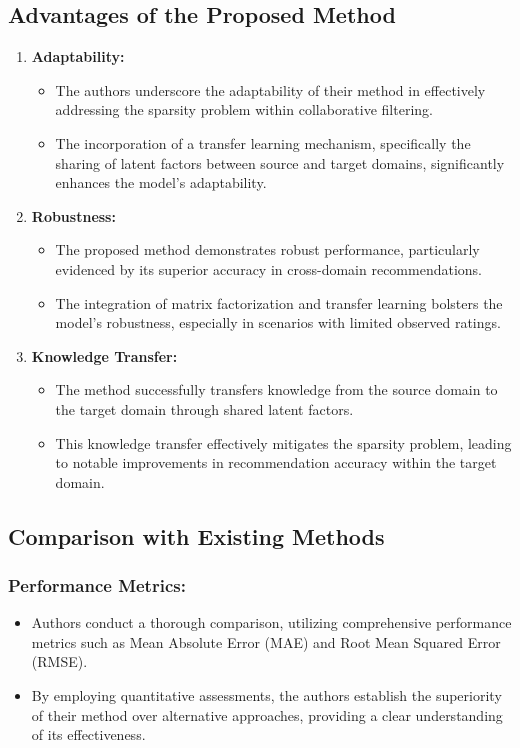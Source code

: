 \documentclass{article}
\begin{document}
\subsection{Advantages of the Proposed Method}
\begin{enumerate}
  \item \textbf{Adaptability:}
    \begin{itemize}
      \item The authors underscore the adaptability of their method in effectively addressing the sparsity problem within collaborative filtering.
      \item The incorporation of a transfer learning mechanism, specifically the sharing of latent factors between source and target domains, significantly enhances the model's adaptability.
    \end{itemize}
  
  \item \textbf{Robustness:}
    \begin{itemize}
      \item The proposed method demonstrates robust performance, particularly evidenced by its superior accuracy in cross-domain recommendations.
      \item The integration of matrix factorization and transfer learning bolsters the model's robustness, especially in scenarios with limited observed ratings.
    \end{itemize}
  
  \item \textbf{Knowledge Transfer:}
    \begin{itemize}
      \item The method successfully transfers knowledge from the source domain to the target domain through shared latent factors.
      \item This knowledge transfer effectively mitigates the sparsity problem, leading to notable improvements in recommendation accuracy within the target domain.
    \end{itemize}
\end{enumerate}

\subsection{Comparison with Existing Methods}
\subsubsection{Performance Metrics:}
\begin{itemize}
  \item Authors conduct a thorough comparison, utilizing comprehensive performance metrics such as Mean Absolute Error (MAE) and Root Mean Squared Error (RMSE).
  \item By employing quantitative assessments, the authors establish the superiority of their method over alternative approaches, providing a clear understanding of its effectiveness.
\end{itemize}
\end{document}
